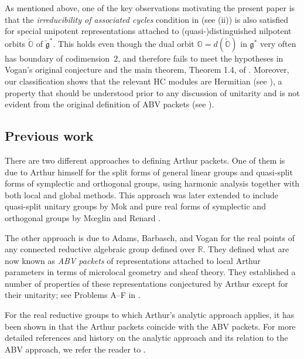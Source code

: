 \documentclass[11pt, a4paper]{amsart}
\newcommand{\orb}{\mathbb{O}}
\newcommand{\fg}{\mathfrak{g}}
\newcommand{\ckfg}{{\check{\fg}}}
\newcommand{\ckorb}{\check{\orb}}
\newcommand{\R}{\mathbb{R}}
\theoremstyle{definition}
\numberwithin{equation}{section}
\begin{document}
As mentioned above, one of the key observations motivating the present paper is that the \emph{irreducibility of associated cycles} condition in \cite[Theorem~5.22]{DMB-Hodge} (see (ii)) is also satisfied for special unipotent representations attached to (quasi-)distinguished nilpotent orbits $\ckorb$ of $\ckfg^*$. This holds even though the dual orbit $\orb=d(\ckorb)$ in $\fg^*$ very often has boundary of codimension~$2$, and therefore fails to meet the hypotheses in Vogan’s original conjecture and the main theorem, Theorem 1.4, of \cite{DMB-Hodge}. Moreover, our classification shows that the relevant HC modules are Hermitian (see ), a property that should be understood prior to any discussion of unitarity and is not evident from the original definition of ABV packets (see ).



\subsection{Previous work} \label{subsec:previous_work}

There are two different approaches to defining Arthur packets. One of them is due to Arthur himself \cite{Arthur:endoscopic} for the split forms of general linear groups and quasi-split forms of symplectic and orthogonal groups, using harmonic analysis together with both local and global methods. This approach was later extended to include quasi-split unitary groups by Mok \cite{Mok} and pure real forms of symplectic and orthogonal groups by Mœglin and Renard \cite{MoeglinRenard2020}. 

The other approach is due to Adams, Barbasch, and Vogan \cite{ABV} for the real points of any connected reductive algebraic group defined over $\R$. They defined what are now known as \emph{ABV packets} of representations attached to local Arthur parameters in terms of microlocal geometry and sheaf theory. They established a number of properties of these representations conjectured by Arthur except for their unitarity; see Problems A--F in \cite[Introduction]{ABV}. 

For the real reductive groups to which Arthur's analytic approach applies, it has been shown in \cite{AdamsArancibiaMezo,ArancibiaMezo:unitary,ArancibiaMezo:symplectic_orthogonal} that the Arthur packets coincide with the ABV packets. For more detailed references and history on the analytic approach and its relation to the ABV approach, we refer the reader to \cite[Section 1.3]{BMSZ:construction_unitarity}.
\end{document}
